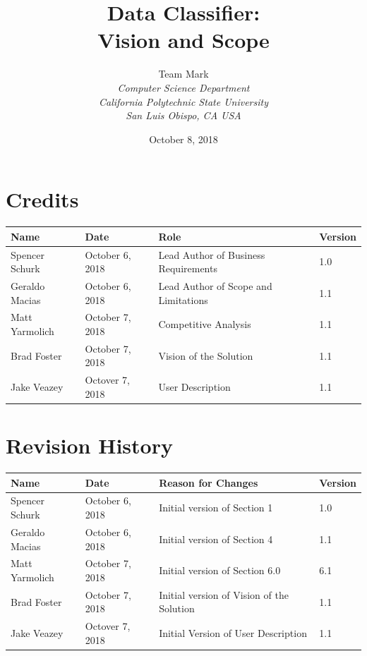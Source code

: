 \documentclass[12pt,oneside,letterpaper]{article}
\begin{document}
\title{\bfseries Data Classifier: \\Vision and Scope}

\author {
\large{Team Mark}\\
\emph{Computer Science Department}\\
\emph{California Polytechnic State University}\\
\emph{San Luis Obispo, CA USA}\\
}

\date{October 8, 2018}
\maketitle \thispagestyle{empty}

\pagebreak
\tableofcontents


\section*{Credits}
\begin{tabular}{|l|l|p{2in}|l|}
\hline
\textbf{Name}&\textbf{Date}&\textbf{Role}&\textbf{Version}\\
\hline
Spencer Schurk&October 6, 2018&Lead Author of Business Requirements&1.0\\
\hline
Geraldo Macias&October 6, 2018&Lead Author of Scope and Limitations&1.1\\
\hline
Matt Yarmolich&October 7, 2018&Competitive Analysis&1.1\\
\hline
Brad Foster&October 7, 2018&Vision of the Solution&1.1\\
\hline
Jake Veazey&Octover 7, 2018&User Description&1.1\\
\hline
\end{tabular}


\section*{Revision History}
\begin{tabular}{|l|l|p{2in}|l|}
\hline
\textbf{Name}&\textbf{Date}&\textbf{Reason for Changes}&\textbf{Version}\\
\hline
Spencer Schurk&October 6, 2018&Initial version of Section 1&1.0\\
\hline
Geraldo Macias&October 6, 2018&Initial version of Section 4&1.1\\
\hline
Matt Yarmolich&October 7, 2018&Initial version of Section 6.0&6.1\\
\hline
Brad Foster&October 7, 2018&Initial version of Vision of the Solution&1.1\\
\hline
Jake Veazey&Octover 7, 2018&Initial Version of User Description&1.1\\
\hline
\end{tabular}
\end{document}
